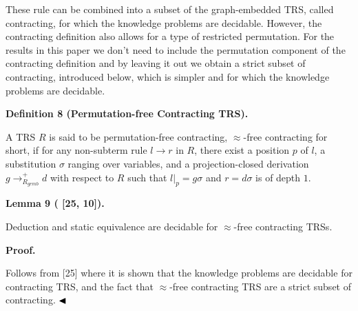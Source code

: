 \documentclass[10pt,a4paper]{amsart}
\begin{document}
These rule can be combined into a subset of the graph-embedded TRS, called contracting, for which the knowledge problems are decidable. However, the contracting definition also allows for a type of restricted permutation. For the results in this paper we don’t need to include the permutation component of the contracting definition and by leaving it out we obtain a strict subset of contracting, introduced below, which is simpler and for which the knowledge problems are decidable.\par
 
 
 
\par\medskip\noindent\textbf{Definition 8 (Permutation-free Contracting TRS).}\par
 
 
A TRS $R$ is said to be permutation-free contracting, $\approx$-free contracting for short, if for any non-subterm rule $l\rightarrow r$ in $R$, there exist a position $p$ of $l$, a substitution $\sigma$ ranging over variables, and a projection-closed derivation $g\rightarrow_{R_{gemb}}^{+}d$ with respect to $R$ such that $l{|_{p}}=g\sigma$ and $r=d\sigma$ is of depth $1$.\par
 
 
 
 
\par\medskip\noindent\textbf{Lemma 9 ( [25, 10]).}\par
 
 
Deduction and static equivalence are decidable for $\approx$-free contracting TRSs.\par
 
 
 
 
\par\medskip\noindent\textbf{Proof.}\par
 
 
Follows from [25] where it is shown that the knowledge problems are decidable for contracting TRS, and the fact that $\approx$-free contracting TRS are a strict subset of contracting. $\hfill\blacktriangleleft$\par
 
\end{document}
